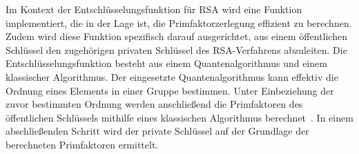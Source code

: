 Im Kontext der Entschlüsselungsfunktion für RSA wird eine Funktion implementiert,
die in der Lage ist, die Primfaktorzerlegung effizient zu berechnen.
Zudem wird diese Funktion spezifisch darauf ausgerichtet, 
aus einem öffentlichen Schlüssel den zugehörigen privaten Schlüssel des RSA-Verfahrens abzuleiten.
Die Entschlüsselungsfunktion besteht aus einem Quantenalgorithmus und einem klassischer Algorithmus.
Der eingesetzte Quantenalgorithmus kann effektiv die Ordnung eines Elements in einer Gruppe bestimmen. 
Unter Einbeziehung der zuvor bestimmten Ordnung werden anschließend die Primfaktoren des öffentlichen Schlüssels mithilfe eines klassischen Algorithmus berechnet~\cite{Shor_1997}.
In einem abschließenden Schritt wird der private Schlüssel auf der Grundlage der berechneten Primfaktoren ermittelt.





